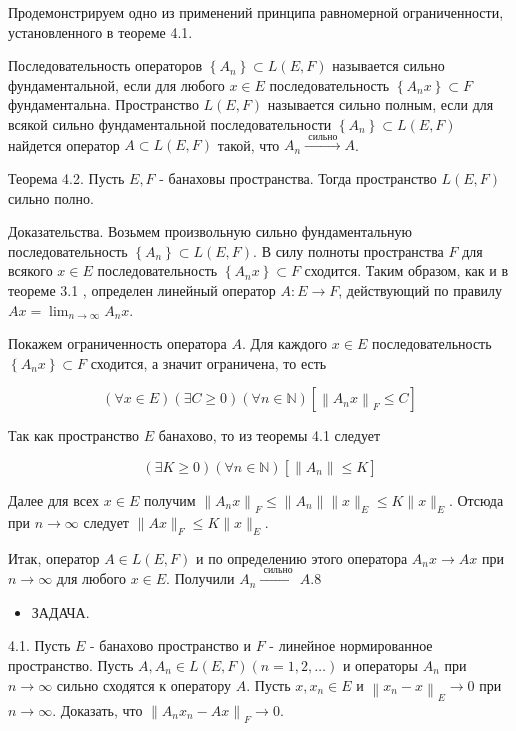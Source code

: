Продемонстрируем одно из применений принципа равномерной ограниченности, установленного в теореме 4.1.

Последовательность операторов $\left\{A_{n}\right\} \subset L(E, F)$ называется сильно фундаментальной, если для любого $x \in E$ последовательность $\left\{A_{n} x\right\} \subset F$ фундаментальна. Пространство $L(E, F)$ называется сильно полным, если для всякой сильно фундаментальной последовательности $\left\{A_{n}\right\} \subset L(E, F)$ найдется оператор $A \subset L(E, F)$ такой, что $A_{n} \stackrel{\text { сильно }}{\longrightarrow} A$.

Теорема 4.2. Пусть $E, F$ - банаховы пространства. Тогда пространство $L(E, F)$ сильно полно.

Доказательства. Возьмем произвольную сильно фундаментальную последовательность $\left\{A_{n}\right\} \subset L(E, F)$. В силу полноты пространства $F$ для всякого $x \in E$ последовательность $\left\{A_{n} x\right\} \subset F$ сходится. Таким образом, как и в теореме 3.1 , определен линейный оператор $A: E \rightarrow F$, действующий по правилу $A x=\lim _{n \rightarrow \infty} A_{n} x$.

Покажем ограниченность оператора $A$. Для каждого $x \in E$ последовательность $\left\{A_{n} x\right\} \subset F$ сходится, а значит ограничена, то есть

$$
(\forall x \in E)(\exists C \geq 0)(\forall n \in \mathbb{N})\left[\left\|A_{n} x\right\|_{F} \leq C\right]
$$

Так как пространство $E$ банахово, то из теоремы 4.1 следует

$$
(\exists K \geq 0)(\forall n \in \mathbb{N})\left[\left\|A_{n}\right\| \leq K\right]
$$

Далее для всех $x \in E$ получим $\left\|A_{n} x\right\|_{F} \leq\left\|A_{n}\right\|\|x\|_{E} \leq K\|x\|_{E}$. Отсюда при $n \rightarrow \infty$ следует $\|A x\|_{F} \leq K\|x\|_{E}$.

Итак, оператор $A \in L(E, F)$ и по определению этого оператора $A_{n} x \rightarrow A x$ при $n \rightarrow \infty$ для любого $x \in E$. Получили $A_{n} \stackrel{\text { сильно }}{\longrightarrow} A .8$

\begin{itemize}
  \item ЗАДАЧА.
\end{itemize}

4.1. Пусть $E$ - банахово пространство и $F$ - линейное нормированное пространство. Пусть $A, A_{n} \in L(E, F)(n=1,2, \ldots)$ и операторы $A_{n}$ при $n \rightarrow \infty$ сильно сходятся к оператору $A$. Пусть $x, x_{n} \in E$ и $\left\|x_{n}-x\right\|_{E} \rightarrow 0$ при $n \rightarrow \infty$. Доказать, что $\left\|A_{n} x_{n}-A x\right\|_{F} \rightarrow 0$.

